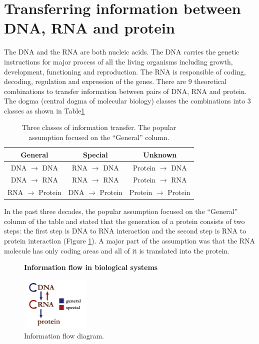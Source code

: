 \section{Transferring information between DNA, RNA and protein}
The DNA and the RNA are both nucleic acids. The DNA carries the genetic instructions for major process of all the living organisms including growth, development, functioning and reproduction. The RNA is responsible of coding, decoding, regulation and expression of the genes.
There are 9 theoretical combinations to transfer information between pairs of DNA, RNA and protein. The dogma (central dogma of molecular biology) classes the combinations into 3 classes as shown in Table\ref{table:1}

\begin{table}[h!]
\centering
\begin{tabular}{||c c c ||} 
\hline
	General & Special & Unknown \\ \hline
	DNA $\rightarrow$ DNA & RNA $\rightarrow$ DNA & Protein $\rightarrow$ DNA \\ \hline
	DNA $\rightarrow$ RNA & RNA $\rightarrow$ RNA & Protein $\rightarrow$ RNA \\ \hline
   	RNA $\rightarrow$ Protein & DNA $\rightarrow$ Protein & Protein $\rightarrow$ Protein \\ \hline
\end{tabular}
\caption{Three classes of information transfer. The popular assumption focused on the “General” column.}
\label{table:1}
\end{table}

In the past three decades, the popular assumption focused on the “General” column of the table and stated that the generation of a protein consists of two steps: the first step is DNA  to RNA interaction and the second step is RNA to protein interaction (Figure \ref{fig:infoflowbio}). A major part of the assumption was that the RNA molecule has only coding areas and all of it is translated into the protein.

\begin{figure}[h!]
	  \centering
	  \caption{\textbf{Information flow in biological systems}}
	  	  \label{fig:infoflowbio}

    \includegraphics[width=0.3\textwidth]{background figures/dna2rna2protein.jpg}
    	\caption*{Information flow diagram. \cite{figRnaDnaPro}
    	}
\end{figure}

